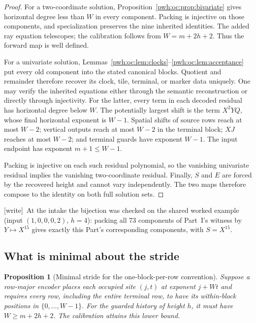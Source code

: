 \documentclass[11pt,letterpaper]{article}
\numberwithin{equation}{section}
\newtheorem{proposition}[theorem]{Proposition}
\theoremstyle{definition}
\newcommand{\wtag}{\textup{[write]}}
\begin{document}
\begin{proof}
For a two-coordinate solution, Proposition~\ref{pwh:oc:prop:bivariate} gives
horizontal degree less than $W$ in every component. Packing is injective
on those components, and specialization preserves the nine inherited
identities. The added ray equation telescopes; the calibration follows
from $W=m+2h+2$. Thus the forward map is well defined.

For a univariate solution, Lemmas~\ref{pwh:oc:lem:clocks}--\ref{pwh:oc:lem:acceptance}
put every old component into the stated canonical blocks. Quotient and
remainder therefore recover its clock, tile, terminal, or marker data
uniquely. One may verify the inherited equations either through the
semantic reconstruction or directly through injectivity. For the latter,
every term in each decoded residual has horizontal degree below $W$.
The potentially largest shift is the term $X^2YQ$, whose final horizontal
exponent is $W-1$. Spatial shifts of source rows reach at most $W-2$;
vertical outputs reach at most $W-2$ in the terminal block; $XJ$ reaches
at most $W-2$; and terminal guards have exponent $W-1$. The input
endpoint has exponent $m+1\le W-1$.

Packing is injective on each such residual polynomial, so the vanishing
univariate residual implies the vanishing two-coordinate residual.
Finally, $S$ and $E$ are forced by the recovered height and cannot vary
independently. The two maps therefore compose to the identity on both
full solution sets.
\end{proof}

\wtag\ At the intake the bijection was checked on the shared worked
example (input $(1,0,0,0,2)$, $h=4$): packing all 73 components of
Part~I's witness by $Y\mapsto X^{15}$ gives exactly this Part's
corresponding components, with $S=X^{15}$.

\subsection{What is minimal about the stride}

\begin{proposition}[Minimal stride for the one-block-per-row convention]
\label{pwh:oc:prop:minimalstride}
Suppose a row-major encoder places each occupied site $(j,t)$ at exponent
$j+Wt$ and requires \emph{every row}, including the entire terminal row,
to have its within-block positions in $\{0,\ldots,W-1\}$. For the guarded
history of height $h$, it must have $W\ge m+2h+2$. The calibration attains
this lower bound.
\end{proposition}
\end{document}
